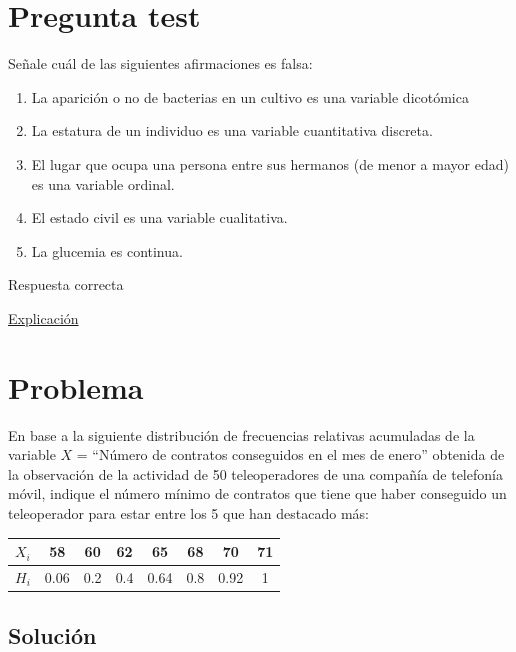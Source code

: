 \documentclass[
]{book}
\providecommand{\tightlist}{%
  \setlength{\itemsep}{0pt}\setlength{\parskip}{0pt}}
\begin{document}
\hypertarget{pregunta-test-4}{%
\section{Pregunta test}\label{pregunta-test-4}}

Señale cuál de las siguientes afirmaciones es falsa:

\begin{enumerate}
\def\labelenumi{\alph{enumi})}
\tightlist
\item
  La aparición o no de bacterias en un cultivo es una variable dicotómica
\item
  La estatura de un individuo es una variable cuantitativa discreta.
\item
  El lugar que ocupa una persona entre sus hermanos (de menor a mayor edad) es una variable ordinal.
\item
  El estado civil es una variable cualitativa.
\item
  La glucemia es continua.
\end{enumerate}

Respuesta correcta

\href{https://1fjmanzano.github.io/bioestadistica/tipos-de-variables.html}{Explicación}

\hypertarget{problema}{%
\section{Problema}\label{problema}}

En base a la siguiente distribución de frecuencias relativas acumuladas de la variable \(X\) = ``Número de contratos conseguidos en el mes de enero'' obtenida de la observación de la actividad de 50 teleoperadores de
una compañía de telefonía móvil, indique el número mínimo de contratos que tiene que haber conseguido un teleoperador para estar entre los 5 que han destacado más:

\begin{longtable}[]{@{}cccccccc@{}}
\toprule
\(X_i\) & 58 & 60 & 62 & 65 & 68 & 70 & 71\tabularnewline
\midrule
\endhead
\(H_i\) & 0.06 & 0.2 & 0.4 & 0.64 & 0.8 & 0.92 & 1\tabularnewline
\bottomrule
\end{longtable}

\hypertarget{soluciuxf3n}{%
\subsection{Solución}\label{soluciuxf3n}}
\end{document}
